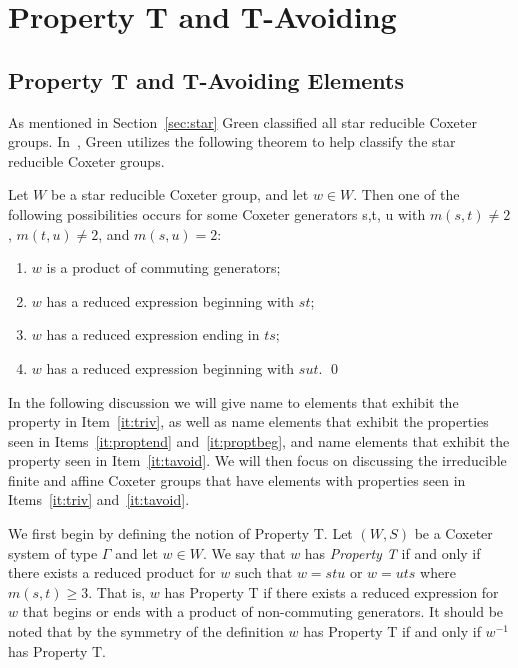 \chapter{Property T and T-Avoiding}\label{chap:TandTavoid}

\section{Property T and T-Avoiding Elements}\label{Tavoid}

As mentioned in Section~\ref{sec:star} Green classified all star reducible Coxeter groups. In~\cite{Green2006a}, Green utilizes the following theorem to help classify the star reducible Coxeter groups. 
\begin{theorem}
	Let $W$ be a star reducible Coxeter group, and let $w \in W$. Then one of the following possibilities occurs for some Coxeter generators s,t, u with $m(s,t) \neq 2$, $m(t,u) \neq 2$, and $m(s,u)=2$:
	\begin{enumerate}
	\item $w$ is a product of commuting generators;\label{it:triv}
	\item $w$ has a reduced expression beginning with $st$;\label{it:proptend}
	\item $w$ has a reduced expression ending in $ts$;\label{it:proptbeg}
	\item $w$ has a reduced expression beginning with $sut$.\label{it:tavoid}	\qed
	\end{enumerate}
\end{theorem}

In the following discussion we will give name to elements that exhibit the property in Item~\ref{it:triv}, as well as name elements that exhibit the properties seen in Items~\ref{it:proptend} and~\ref{it:proptbeg}, and name elements that exhibit the property seen in Item~\ref{it:tavoid}. We will then focus on discussing the irreducible finite and affine Coxeter groups that have elements with properties seen in Items~\ref{it:triv} and~\ref{it:tavoid}.

We first begin by defining the notion of Property T. Let $(W,S)$ be a Coxeter system of type $\Gamma$ and let $w \in W$. We say that $w$ has \emph{Property T} if and only if there exists a reduced product for $w$ such that $w=stu$ or $w=uts$ where $m(s,t)\geq 3$. That is, $w$ has Property T if there exists a reduced expression for $w$ that begins or ends with a product of non-commuting generators. It should be noted that by the symmetry of the definition $w$ has Property T if and only if $w^{-1}$ has Property T.

